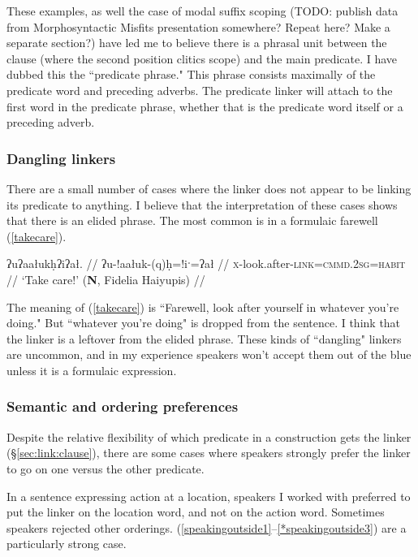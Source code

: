 
These examples, as well the case of modal suffix scoping (TODO: publish data from Morphosyntactic Misfits presentation somewhere? Repeat here? Make a separate section?) have led me to believe there is a phrasal unit between the clause (where the second position clitics scope) and the main predicate. I have dubbed this the ``predicate phrase." This phrase consists maximally of the predicate word and preceding adverbs. The predicate linker will attach to the first word in the predicate phrase, whether that is the predicate word itself or a preceding adverb.

\subsubsection{Dangling linkers} \label{sec:link:dangling}

There are a small number of cases where the linker does not appear to be linking its predicate to anything. I believe that the interpretation of these cases shows that there is an elided phrase. The most common is in a formulaic farewell (\ref{takecare}).

\ex \label{takecare}
\begingl
\glpreamble ʔuʔaałukḥʔiʔał. //
\gla ʔu-!aałuk-(q)ḥ=!iˑ=ʔał //
\glb \textsc{x}-look.after-\textsc{link}=\textsc{cmmd.2sg}=\textsc{habit} //
\glft `Take care!' (\textbf{N}, Fidelia Haiyupis) //
\endgl
\xe

The meaning of (\ref{takecare}) is ``Farewell, look after yourself in whatever you're doing." But ``whatever you're doing" is dropped from the sentence. I think that the linker is a leftover from the elided phrase. These kinds of ``dangling" linkers are uncommon, and in my experience speakers won't accept them out of the blue unless it is a formulaic expression.

\subsubsection{Semantic and ordering preferences} \label{sec:link:preferences}

Despite the relative flexibility of which predicate in a construction gets the linker (\S\ref{sec:link:clause}), there are some cases where speakers strongly prefer the linker to go on one versus the other predicate.

In a sentence expressing action at a location, speakers I worked with preferred to put the linker on the location word, and not on the action word. Sometimes speakers rejected other orderings. (\ref{speakingoutside1}--\ref{*speakingoutside3}) are a particularly strong case.

